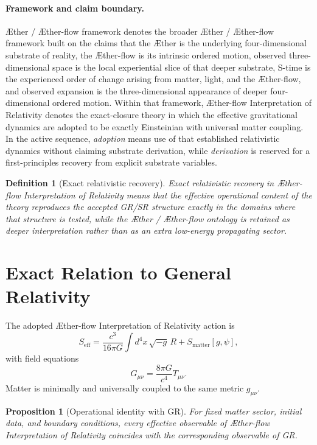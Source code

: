 \documentclass[11pt]{article}
\newcommand{\Aether}{\AE{}ther}
\newcommand{\Aflow}{\AE{}ther-flow}
\newcommand{\TheoryName}{\Aflow{} Interpretation of Relativity}
\newcommand{\TheoryProgram}{\Aether{} / \Aflow{} framework}
\newtheorem{definition}{Definition}
\newtheorem{proposition}{Proposition}
\begin{document}
\paragraph{Framework and claim boundary.}
\TheoryProgram{} denotes the broader \Aether{} / \Aflow{} framework built on the claims that the \Aether{} is the underlying four-dimensional substrate of reality, the \Aflow{} is its intrinsic ordered motion, observed three-dimensional space is the local experiential slice of that deeper substrate, S-time is the experienced order of change arising from matter, light, and the \Aflow{}, and observed expansion is the three-dimensional appearance of deeper four-dimensional ordered motion. Within that framework, \TheoryName{} denotes the exact-closure theory in which the effective gravitational dynamics are adopted to be exactly Einsteinian with universal matter coupling. In the active sequence, \emph{adoption} means use of that established relativistic dynamics without claiming substrate derivation, while \emph{derivation} is reserved for a first-principles recovery from explicit substrate variables.

\begin{definition}[Exact relativistic recovery]
Exact relativistic recovery in \TheoryName{} means that the effective operational content of the theory reproduces the accepted GR/SR structure exactly in the domains where that structure is tested, while the \Aether{} / \Aflow{} ontology is retained as deeper interpretation rather than as an extra low-energy propagating sector.
\end{definition}

\section{Exact Relation to General Relativity}

The adopted \TheoryName{} action is
\begin{equation}
S_{\mathrm{eff}}
=
\frac{c^3}{16\pi G}\int d^4x\,\sqrt{-g}\,R
+
S_{\mathrm{matter}}[g,\psi],
\label{eq:SA}
\end{equation}
with field equations
\begin{equation}
G_{\mu\nu}
=
\frac{8\pi G}{c^4}T_{\mu\nu}.
\label{eq:einstein}
\end{equation}
Matter is minimally and universally coupled to the same metric \(g_{\mu\nu}\).

\begin{proposition}[Operational identity with GR]
For fixed matter sector, initial data, and boundary conditions, every effective observable of \TheoryName{} coincides with the corresponding observable of GR.
\end{proposition}
\end{document}
